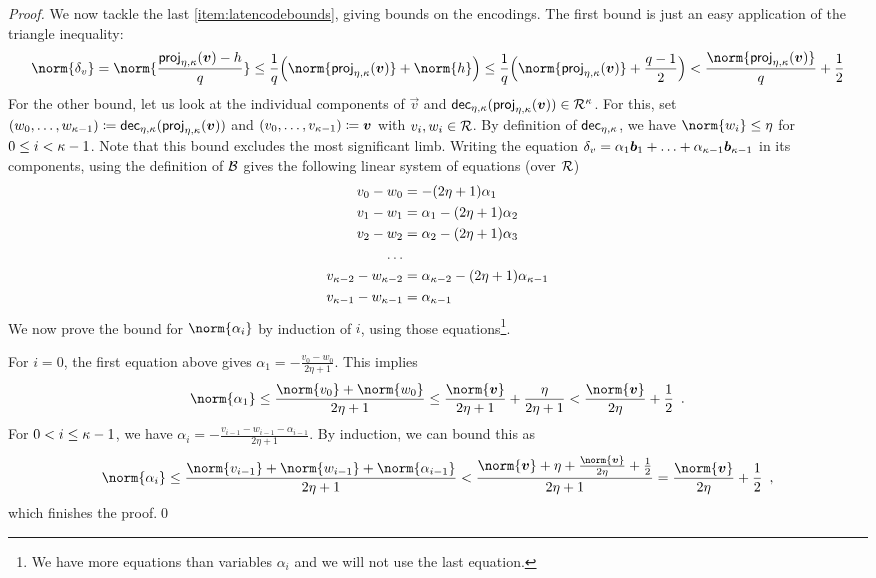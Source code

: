 \begin{proof}
\bigskip\noindent
We now tackle the last \autoref{item:latencodebounds}, giving bounds on the encodings.
The first bound is just an easy application of the triangle inequality:
\[
 \norm{\delta_v} = \norm{ \frac{\projring(\vec{v}) - h}{q}} \leq \frac{1}{q} \Bigl( \norm{\projring(\vec{v})} + \norm{h}\Bigr)
 \leq \frac{1}{q}\Bigl(\norm{\projring(\vec{v})} + \frac{q-1}{2}\Bigr)
 < \frac{\norm{\projring(\vec{v})}}{q} + \frac{1}{2}
\]
For the other bound, let us look at the individual components of $\vec{v}$ and $\mathsf{dec}_{\eta,\kappa}(\mathsf{proj}_{\eta,\kappa}(\boldsymbol{v})) \in\mathcal{R}^\kappa$.
For this, set $(w_0,\ldots, w_{\kappa-1})  \coloneqq \mathsf{dec}_{\eta,\kappa}(\mathsf{proj}_{\eta,\kappa}(\boldsymbol{v}))$ and 
$(v_0,\ldots,v_{\kappa-1}) \coloneqq \boldsymbol{v}$ with $v_i,w_i\in\mathcal{R}$.
By definition of $\mathsf{dec}_{\eta,\kappa}$, we have $\norm{w_i}\leq \eta$ for $0\leq i < \kappa-1$.
Note that this bound excludes the most significant limb.
Writing the equation $\delta_v = \alpha_1\boldsymbol{b}_1 + \ldots + \alpha_{\kappa-1}\boldsymbol{b}_{\kappa-1}$ in its components, using the definition of $\mathcal{B}$ gives the following linear system of equations (over $\mathcal{R}$)
\begin{align*}
v_0 - w_0 &= -(2\eta+1)\alpha_1\\
v_1 - w_1 &= \alpha_1 - (2\eta+1)\alpha_2\\
v_2 - w_2 &= \alpha_2 - (2\eta+1)\alpha_3\\
\ldots\\
v_{\kappa-2} - w_{\kappa-2} &= \alpha_{\kappa-2} - (2\eta+1)\alpha_{\kappa-1}\\
v_{\kappa-1} - w_{\kappa-1} &= \alpha_{\kappa-1}
\end{align*}
We now prove the bound for $\norm{\alpha_i}$ by induction of $i$, using those equations\footnote{We have more equations than variables $\alpha_i$ and we will not use the last equation.}.

\smallskip\noindent
For $i=0$, the first equation above gives $\alpha_1 = -\frac{v_0-w_0}{2\eta+1}$. This implies
\[
  \norm{\alpha_1} \leq \frac{\norm{v_0} + \norm{w_0}}{2\eta+1} \leq \frac{\norm{\vec{v}}}{2\eta+1} + \frac{\eta}{2\eta+1} < \frac{\norm{\vec{v}}}{2\eta} + \frac12\enspace.
\]
For $0<i\leq \kappa-1$, we have $\alpha_i = -\frac{v_{i-1}-w_{i-1} - \alpha_{i-1}}{2\eta+1}$. By induction, we can bound this as
\[
 \norm{\alpha_i} 
 \leq \frac{ \norm{v_{i-1}} + \norm{w_{i-1}} + \norm{\alpha_{i-1}} } {2\eta+1}
 < \frac{ \norm{\vec{v}} + \eta + \frac{\norm{\vec{v}}}{2\eta} + \frac{1}{2} }{2\eta+1} = \frac{\norm{\vec{v}}}{2\eta} + \frac{1}{2}\enspace,
\]
which finishes the proof.\qed
\end{proof}


